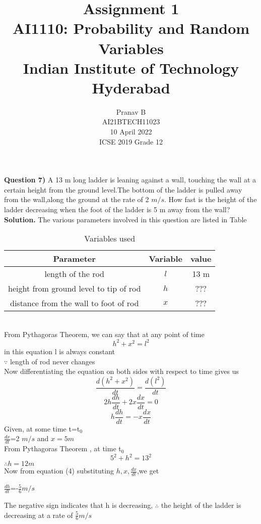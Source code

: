 \documentclass[journal,12pt,twocolumn]{IEEEtran}
\title{Assignment 1 \\ \Large AI1110: Probability and Random Variables \\ \large Indian Institute of Technology Hyderabad}
\author{Pranav B \\ \normalsize AI21BTECH11023 \\ \vspace*{20pt} \normalsize  10 April 2022 \\ \vspace*{20pt} \Large ICSE 2019 Grade 12}
\begin{document}
	\maketitle
	
	\textbf{Question 7)} 
	A 13 m long ladder is leaning against a wall, touching the wall at a certain height from the ground level.The bottom of the ladder is pulled away from the wall,along the ground at the rate of 2 $m/s$. How fast is the height of the ladder decreasing when the foot of the ladder is 5 m away from the wall?\\
	\textbf{Solution.}
	The various parameters involved in this question are listed in Table \begin{table}[h]
\caption{Variables used}
\begin{tabular}{|c|c|c|}
\hline
Parameter & Variable & value\\
\hline
length of the rod & $l$ & 13 m\\
\hline
height from ground level to tip of rod & $h$ & ???\\
\hline
distance from the wall to foot of rod & $x$ &???\\
\hline
\end{tabular}
\end{table}
\\
From Pythagoras Theorem, we can say that at any point of time\\
\begin{equation}
h^2+x^2=l^2
\end{equation}
in this equation l is always constant\\
 $\because$ length of rod never changes\\
 Now differentiating the equation on both sides with respect to time gives us\\
 \begin{equation}
 \frac{d(h^2+x^2)}{dt}=\frac{d(l^2)}{dt}
 \end{equation}
 \begin{equation}
  2h\frac{dh}{dt}+2x\frac{dx}{dt}=0
 \end{equation}
 \begin{equation}
 h\frac{dh}{dt}=-x\frac{dx}{dt}
 \end{equation}
 Given, at some time t=t$_0$\\
  $\frac{dx}{dt}$=2 $m/s$ and $x= 5 m$\\
  From Pythagoras Theorem , at time t$_0$
  \begin{equation}
  5^2+h^2=13^2
  \end{equation}
  $\therefore h= 12 m$\\
  Now from equation (4) substituting $h,x,\frac{dx}{dt}$,we get\\
  \begin{center}
   $\frac{dh}{dt}$=-$\frac{5}{6} m/s$
\end{center}  
The negative sign indicates that h is decreasing,
$\therefore$ the height of the ladder is decreasing at a rate of $\frac{5}{6} m/s$
\end{document}
